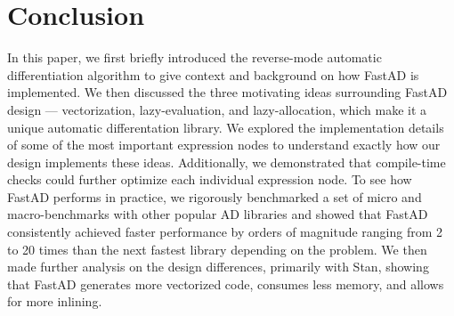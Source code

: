 \section{Conclusion}

In this paper, we first briefly introduced the reverse-mode automatic differentiation algorithm
to give context and background on how FastAD is implemented.
We then discussed the three motivating ideas surrounding FastAD design ---  
vectorization, lazy-evaluation, and lazy-allocation,
which make it a unique automatic differentation library.
We explored the implementation details of some of the most important expression nodes
to understand exactly how our design implements these ideas.
Additionally, we demonstrated that compile-time checks could
further optimize each individual expression node.
To see how FastAD performs in practice, we rigorously benchmarked 
a set of micro and macro-benchmarks
with other popular AD libraries and showed that FastAD consistently achieved
faster performance by orders of magnitude ranging from 2 to 20 times 
than the next fastest library depending on the problem.
We then made further analysis on the design differences,
primarily with Stan, showing that FastAD generates more vectorized code,
consumes less memory,
and allows for more inlining.

